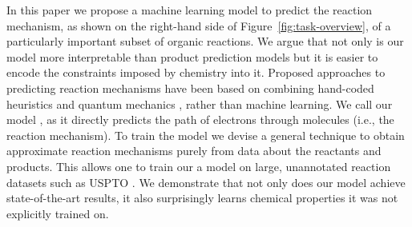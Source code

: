 In this paper we propose a machine learning model to predict the reaction mechanism, as shown on the right-hand side of Figure~\ref{fig:task-overview}, of a particularly important subset of organic reactions.
We argue that not only is our model more interpretable than product prediction models but it is easier to encode the constraints imposed by chemistry into it. 
Proposed approaches to predicting reaction mechanisms have been based on combining hand-coded heuristics and quantum mechanics \cite{bergeler2015heuristics,kim2018efficient,rappoport2014complex,simm2017context,zimmerman2013automated}, 
rather than machine learning.
We call our model \ourModel, as it directly predicts the path of electrons through molecules (i.e., the reaction mechanism). To train the model we devise a general technique to obtain approximate reaction mechanisms purely from data about the reactants and products. This allows one to train our a model on large, unannotated reaction datasets such as USPTO \cite{lowe2012extraction}. We demonstrate that not only does our model achieve state-of-the-art results, it also surprisingly learns chemical properties it was not explicitly trained on.



